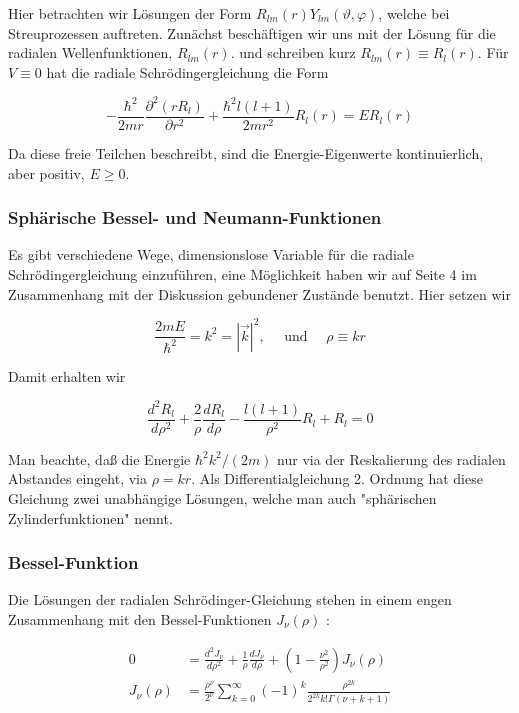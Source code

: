 \documentclass[10pt, letterpaper]{article}
\begin{document}
Hier betrachten wir Lösungen der Form $R_{l m}(r) Y_{l m}(\vartheta, \varphi)$, welche bei Streuprozessen auftreten. Zunächst beschäftigen wir uns mit der Lösung für die radialen Wellenfunktionen, $R_{l m}(r)$. und schreiben kurz $R_{l m}(r) \equiv R_{l}(r)$. Für $V \equiv 0$ hat die radiale Schrödingergleichung die Form

$$
-\frac{\hbar^{2}}{2 m r} \frac{\partial^{2}\left(r R_{l}\right)}{\partial r^{2}}+\frac{\hbar^{2} l(l+1)}{2 m r^{2}} R_{l}(r)=E R_{l}(r)
$$

Da diese freie Teilchen beschreibt, sind die Energie-Eigenwerte kontinuierlich, aber positiv, $E \geq 0$.

\subsubsection*{Sphärische Bessel- und Neumann-Funktionen}
Es gibt verschiedene Wege, dimensionslose Variable für die radiale Schrödingergleichung einzuführen, eine Möglichkeit haben wir auf Seite 4 im Zusammenhang mit der Diskussion gebundener Zustände benutzt. Hier setzen wir

$$
\frac{2 m E}{\hbar^{2}}=k^{2}=|\vec{k}|^{2}, \quad \text { und } \quad \rho \equiv k r
$$

Damit erhalten wir

$$
\frac{d^{2} R_{l}}{d \rho^{2}}+\frac{2}{\rho} \frac{d R_{l}}{d \rho}-\frac{l(l+1)}{\rho^{2}} R_{l}+R_{l}=0
$$

Man beachte, daß die Energie $\hbar^{2} k^{2} /(2 m)$ nur via der Reskalierung des radialen Abstandes eingeht, via $\rho=k r$. Als Differentialgleichung 2. Ordnung hat diese Gleichung zwei unabhängige Lösungen, welche man auch "sphärischen Zylinderfunktionen" nennt.

\subsubsection*{Bessel-Funktion}
Die Lösungen der radialen Schrödinger-Gleichung stehen in einem engen Zusammenhang mit den Bessel-Funktionen $J_{\nu}(\rho)$ :

$$
\begin{aligned}
0 & =\frac{d^{2} J_{\nu}}{d \rho^{2}}+\frac{1}{\rho} \frac{d J_{\nu}}{d \rho}+\left(1-\frac{\nu^{2}}{\rho^{2}}\right) J_{\nu}(\rho) \\
J_{\nu}(\rho) & =\frac{\rho^{\nu}}{2^{\nu}} \sum_{k=0}^{\infty}(-1)^{k} \frac{\rho^{2 k}}{2^{2 k} k!\Gamma(\nu+k+1)}
\end{aligned}
$$
\end{document}
